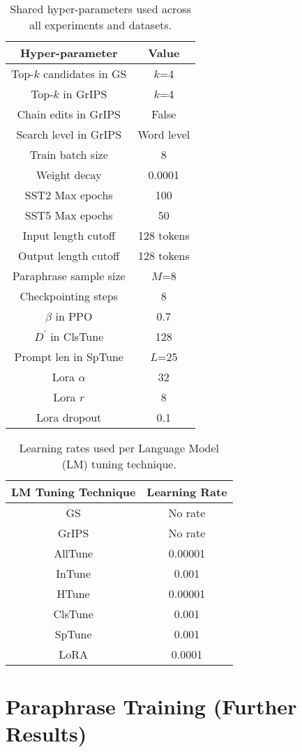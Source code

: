 \documentclass[11pt]{article}
\begin{document}
\begin{table}[t]
\centering
\caption{Shared hyper-parameters used across all experiments and datasets.}
\begin{tabular}{ c | c }
\hline
Hyper-parameter & Value\\
\hline
Top-$k$ candidates in GS & $k$=4 \\
Top-$k$ in GrIPS & $k$=4 \\
Chain edits in GrIPS & False \\
Search level in GrIPS & Word level \\
Train batch size & 8 \\
Weight decay & 0.0001 \\
SST2 Max epochs & 100 \\
SST5 Max epochs & 50 \\
Input length cutoff & 128 tokens \\
Output length cutoff & 128 tokens \\
Paraphrase sample size & $M$=8 \\
Checkpointing steps & 8 \\
$\beta$ in PPO & 0.7 \\
$D^{'}$ in ClsTune & 128 \\
Prompt len in SpTune & $L$=25 \\
Lora $\alpha$ & 32 \\
Lora $r$ & 8 \\
Lora dropout & 0.1 \\
\end{tabular}
\label{hyper-parameters}
\end{table}

\begin{table}[t]
\centering
\caption{Learning rates used per Language Model (LM) tuning technique.}
\begin{tabular}{ c | c }
\hline
LM Tuning Technique & Learning Rate\\
\hline
GS & No rate \\
GrIPS & No rate \\
AllTune & 0.00001 \\
InTune &  0.001 \\
HTune & 0.00001 \\
ClsTune & 0.001 \\
SpTune & 0.001 \\
LoRA & 0.0001
\end{tabular}
\label{learning-rates}
\end{table}

\section{Paraphrase Training (Further Results)}
\label{training-paraphrase-extra:appendix}
\end{document}
